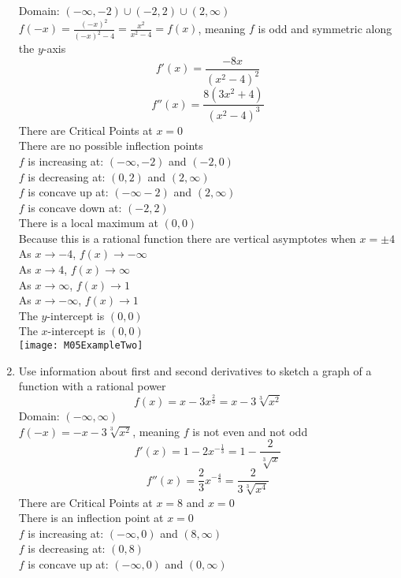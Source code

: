 \documentclass{article}
\begin{document}
\begin{enumerate}
    Domain: $(-\infty, -2)\cup(-2, 2)\cup(2, \infty)$ \\
    $f(-x) = \frac{\left(-x\right)^2}{\left(-x\right)^2 - 4} = \frac{x^2}{x^2 - 4} = f(x)$, meaning $f$ is odd and symmetric along the $y$-axis
    $$f'(x) = \frac{-8x}{\left(x^2 - 4\right)^2}$$
    $$f''(x) = \frac{8\left(3x^2 + 4\right)}{\left(x^2 - 4\right)^3}$$
    There are Critical Points at $x = 0$ \\
    There are no possible inflection points \\
    $f$ is increasing at: $(-\infty, -2)$ and $(-2, 0)$ \\
    $f$ is decreasing at: $(0, 2)$ and $(2, \infty)$ \\
    $f$ is concave up at: $(-\infty -2)$ and $(2, \infty)$ \\
    $f$ is concave down at: $(-2, 2)$ \\
    There is a local maximum at $\left(0, 0\right)$ \\
    Because this is a rational function there are vertical asymptotes when $x = \pm 4$ \\
    As $x \to -4$, $f(x) \to -\infty$ \\
    As $x \to 4$, $f(x) \to \infty$ \\
    As $x \to \infty$, $f(x) \to 1$ \\
    As $x \to -\infty$, $f(x) \to 1$ \\
    The $y$-intercept is $(0, 0)$ \\
    The $x$-intercept is $(0, 0)$ \\
    \texttt{[image: M05ExampleTwo]}
    \item Use information about first and second derivatives to sketch a graph of a function with a rational power
    $$f(x) = x-3x^{\frac{2}{3}} = x - 3\sqrt[3]{x^2}$$
    Domain: $(-\infty, \infty)$ \\
    $f(-x) = -x - 3\sqrt[3]{x^2}$, meaning $f$ is not even and not odd \\
    $$f'(x) = 1 - 2x^{-\frac{1}{3}} = 1 - \frac{2}{\sqrt[3]{x}}$$
    $$f''(x) = \frac{2}{3}x^{-\frac{4}{3}} = \frac{2}{3\sqrt[3]{x^4}}$$
    There are Critical Points at $x = 8$ and $x = 0$ \\
    There is an inflection point at $x = 0$ \\
    $f$ is increasing at: $(-\infty, 0)$ and $(8, \infty)$ \\
    $f$ is decreasing at: $(0, 8)$ \\
    $f$ is concave up at: $(-\infty, 0)$ and $(0, \infty)$ \\

\end{enumerate}
\end{document}

